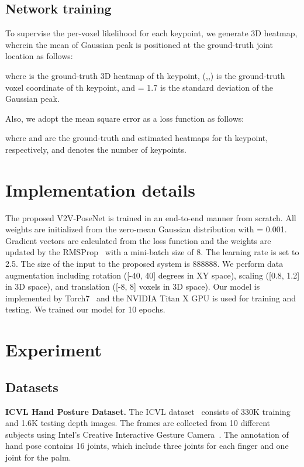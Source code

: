\documentclass[10pt,twocolumn,letterpaper]{article}
\begin{document}
\subsection{Network training}
To supervise the per-voxel likelihood for each keypoint, we generate 3D heatmap, wherein the mean of Gaussian peak is positioned at the ground-truth joint location as follows: 


where  is the ground-truth 3D heatmap of th keypoint, (,,) is the ground-truth voxel coordinate of th keypoint, and  = 1.7 is the standard deviation of the Gaussian peak.

Also, we adopt the mean square error as a loss function  as follows:


where  and  are the ground-truth and estimated heatmaps for th keypoint, respectively, and  denotes the number of keypoints.



 \section{Implementation details}
The proposed V2V-PoseNet is trained in an end-to-end manner from scratch. All weights are initialized from the zero-mean Gaussian distribution with  = 0.001. Gradient vectors are calculated from the loss function and the weights are updated by the RMSProp~\cite{tieleman2012lecture} with a mini-batch size of 8. The learning rate is set to 2.5. The size of the input to the proposed system is 888888. We perform data augmentation including rotation ([-40, 40] degrees in XY space), scaling ([0.8, 1.2] in 3D space), and translation ([-8, 8] voxels in 3D space). Our model is implemented by Torch7~\cite{collobert2011torch7} and the NVIDIA Titan X GPU is used for training and testing. We trained our model for 10 epochs.

 \section{Experiment}

\subsection{Datasets}
{\bf ICVL Hand Posture Dataset.} 
The ICVL dataset~\cite{tang2014latent} consists of 330K training and 1.6K testing depth images. The frames are collected from 10 different subjects using Intel's Creative Interactive Gesture Camera~\cite{melax2013dynamics}. The annotation of hand pose contains 16 joints, which include three joints for each finger and one joint for the palm.
\end{document}
